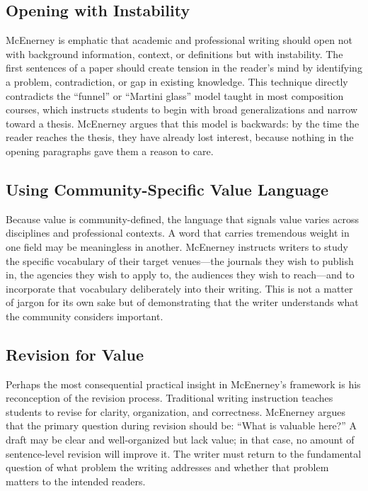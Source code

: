 \documentclass[12pt]{article}
\begin{document}
\subsection*{Opening with Instability}

McEnerney is emphatic that academic and professional writing should open not with background information, context, or definitions but with instability. The first sentences of a paper should create tension in the reader's mind by identifying a problem, contradiction, or gap in existing knowledge. This technique directly contradicts the ``funnel'' or ``Martini glass'' model taught in most composition courses, which instructs students to begin with broad generalizations and narrow toward a thesis. McEnerney argues that this model is backwards: by the time the reader reaches the thesis, they have already lost interest, because nothing in the opening paragraphs gave them a reason to care.

\subsection*{Using Community-Specific Value Language}

Because value is community-defined, the language that signals value varies across disciplines and professional contexts. A word that carries tremendous weight in one field may be meaningless in another. McEnerney instructs writers to study the specific vocabulary of their target venues---the journals they wish to publish in, the agencies they wish to apply to, the audiences they wish to reach---and to incorporate that vocabulary deliberately into their writing. This is not a matter of jargon for its own sake but of demonstrating that the writer understands what the community considers important.

\subsection*{Revision for Value}

Perhaps the most consequential practical insight in McEnerney's framework is his reconception of the revision process. Traditional writing instruction teaches students to revise for clarity, organization, and correctness. McEnerney argues that the primary question during revision should be: ``What is valuable here?'' A draft may be clear and well-organized but lack value; in that case, no amount of sentence-level revision will improve it. The writer must return to the fundamental question of what problem the writing addresses and whether that problem matters to the intended readers.
\end{document}
